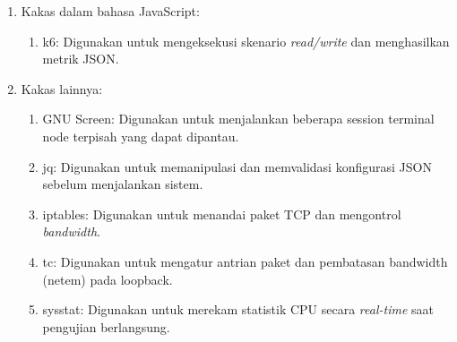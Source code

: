 \begin{enumerate}
  \item Kakas dalam bahasa JavaScript:
    \begin{enumerate}
      \item k6: Digunakan untuk mengeksekusi skenario \textit{read/write} dan menghasilkan metrik JSON.
    \end{enumerate}
  \item Kakas lainnya:
    \begin{enumerate}
      \item GNU Screen: Digunakan untuk menjalankan beberapa session terminal node terpisah yang dapat dipantau.
      \item jq: Digunakan untuk memanipulasi dan memvalidasi konfigurasi JSON sebelum menjalankan sistem.
      \item iptables: Digunakan untuk menandai paket TCP dan mengontrol \textit{bandwidth}.
      \item tc: Digunakan untuk mengatur antrian paket dan pembatasan bandwidth (netem) pada loopback.
      \item sysstat: Digunakan untuk merekam statistik CPU secara \textit{real-time} saat pengujian berlangsung.
    \end{enumerate}
\end{enumerate}